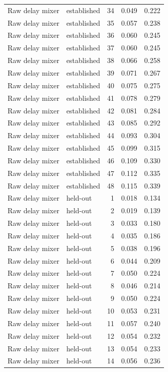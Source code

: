 \begin{tabular}{llrrr}
Raw delay mixer & established & 34 & 0.049 & 0.222 \\
Raw delay mixer & established & 35 & 0.057 & 0.238 \\
Raw delay mixer & established & 36 & 0.060 & 0.245 \\
Raw delay mixer & established & 37 & 0.060 & 0.245 \\
Raw delay mixer & established & 38 & 0.066 & 0.258 \\
Raw delay mixer & established & 39 & 0.071 & 0.267 \\
Raw delay mixer & established & 40 & 0.075 & 0.275 \\
Raw delay mixer & established & 41 & 0.078 & 0.279 \\
Raw delay mixer & established & 42 & 0.081 & 0.284 \\
Raw delay mixer & established & 43 & 0.085 & 0.292 \\
Raw delay mixer & established & 44 & 0.093 & 0.304 \\
Raw delay mixer & established & 45 & 0.099 & 0.315 \\
Raw delay mixer & established & 46 & 0.109 & 0.330 \\
Raw delay mixer & established & 47 & 0.112 & 0.335 \\
Raw delay mixer & established & 48 & 0.115 & 0.339 \\
Raw delay mixer & held-out & 1 & 0.018 & 0.134 \\
Raw delay mixer & held-out & 2 & 0.019 & 0.139 \\
Raw delay mixer & held-out & 3 & 0.033 & 0.180 \\
Raw delay mixer & held-out & 4 & 0.035 & 0.186 \\
Raw delay mixer & held-out & 5 & 0.038 & 0.196 \\
Raw delay mixer & held-out & 6 & 0.044 & 0.209 \\
Raw delay mixer & held-out & 7 & 0.050 & 0.224 \\
Raw delay mixer & held-out & 8 & 0.046 & 0.214 \\
Raw delay mixer & held-out & 9 & 0.050 & 0.224 \\
Raw delay mixer & held-out & 10 & 0.053 & 0.231 \\
Raw delay mixer & held-out & 11 & 0.057 & 0.240 \\
Raw delay mixer & held-out & 12 & 0.054 & 0.232 \\
Raw delay mixer & held-out & 13 & 0.054 & 0.233 \\
Raw delay mixer & held-out & 14 & 0.056 & 0.236 \\

\end{tabular}
